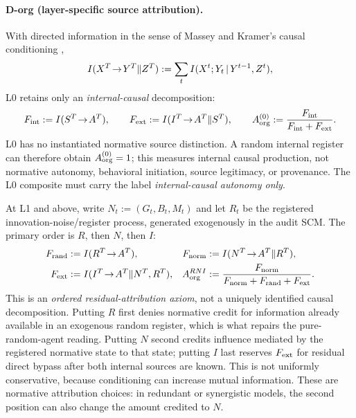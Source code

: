 \paragraph{D-org (layer-specific source attribution).}
With directed information in the sense of Massey \citep{massey1990} and
Kramer's causal conditioning \citep{kramer2003},
\[
I(X^T\!\to\!Y^T\|Z^T):=\sum_t I(X^t;Y_t\,|\, Y^{t-1},Z^t),
\]
L0 retains only an \emph{internal-causal} decomposition:
\begin{equation}\label{eq:aorg}
F_{\mathrm{int}}:=I(S^T\!\to\!A^T),\qquad
F_{\mathrm{ext}}:=I(I^T\!\to\!A^T\|S^T),\qquad
A_{\mathrm{org}}^{(0)}:=\frac{F_{\mathrm{int}}}{F_{\mathrm{int}}+F_{\mathrm{ext}}}.
\end{equation}
L0 has no instantiated normative source distinction. A random internal
register can therefore obtain $A_{\mathrm{org}}^{(0)}=1$; this measures internal causal
production, not normative autonomy, behavioral initiation, source legitimacy,
or provenance. The L0 composite must carry the label \emph{internal-causal
autonomy only}.

At L1 and above, write $N_t:=(G_t,B_t,M_t)$ and let $R_t$ be the registered
innovation-noise/register process, generated exogenously in the audit SCM. The
primary order is $R$, then $N$, then $I$:
\begin{equation}\label{eq:aorgnorm}
\begin{aligned}
F_{\mathrm{rand}}&:=I(R^T\!\to\!A^T),&
F_{\mathrm{norm}}&:=I(N^T\!\to\!A^T\|R^T),\\
F_{\mathrm{ext}}&:=I(I^T\!\to\!A^T\|N^T,R^T),&
A_{\mathrm{org}}^{RNI}&:=\frac{F_{\mathrm{norm}}}{F_{\mathrm{norm}}+F_{\mathrm{rand}}+F_{\mathrm{ext}}}.
\end{aligned}
\end{equation}
This is an \emph{ordered residual-attribution axiom}, not a uniquely identified
causal decomposition. Putting $R$ first denies normative credit for information
already available in an exogenous random register, which is what repairs the
pure-random-agent reading. Putting $N$ second credits influence mediated by the
registered normative state to that state; putting $I$ last reserves $F_{\mathrm{ext}}$ for
residual direct bypass after both internal sources are known. This is not
uniformly conservative, because conditioning can increase mutual information.
These are normative attribution choices: in redundant or synergistic models,
the second position can also change the amount credited to $N$.

